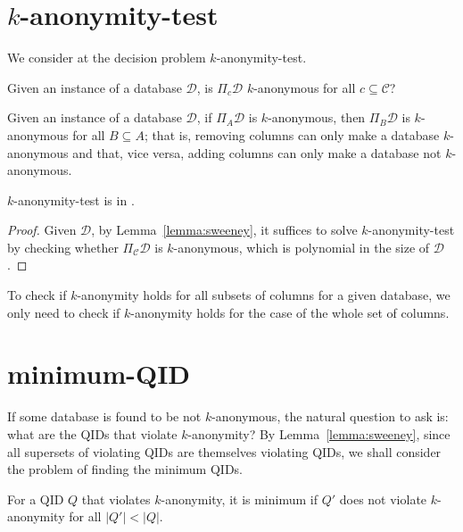 \documentclass[12pt]{llncs}
\newcommand{\cC}{\mathcal{C}}
\newcommand{\cD}{\mathcal{D}}
\newcommand{\Proj}[1]{\Pi_{#1}}
\begin{document}
\section{$k$-anonymity-test}

We consider at the decision problem $k$-anonymity-test.

\begin{problem}
Given an instance of a database $\cD$, is $\Proj{c} \cD$ $k$-anonymous for all $c \subseteq \cC$?
\end{problem}

\begin{lemma}
Given an instance of a database $\cD$, if $\Proj{A} \cD$ is $k$-anonymous, then $\Proj{B} \cD$ is $k$-anonymous for all $B \subseteq A$; that is, removing columns can only make a database $k$-anonymous and that, vice versa, adding columns can only make a database not $k$-anonymous.
\label{lemma:sweeney}
\end{lemma}

\begin{proposition}
$k$-anonymity-test is in .
\end{proposition}

\begin{proof}
Given $\cD$, by Lemma~\ref{lemma:sweeney}, it suffices to solve $k$-anonymity-test by checking whether $\Proj{\cC} \cD$ is $k$-anonymous, which is polynomial in the size of $\cD$.
\end{proof}

\begin{corollary}
To check if $k$-anonymity holds for all subsets of columns for a given database, we only need to check if $k$-anonymity holds for the case of the whole set of columns.
\end{corollary}

\section{minimum-QID}
If some database is found to be not $k$-anonymous, the natural question to ask is: what are the QIDs that violate $k$-anonymity? By Lemma~\ref{lemma:sweeney}, since all supersets of violating QIDs are themselves violating QIDs, we shall consider the problem of finding the minimum QIDs.

\begin{definition}
For a QID $Q$ that violates $k$-anonymity, it is minimum if $Q'$ does not violate $k$-anonymity for all $|Q'| < |Q|$.
\end{definition}
\end{document}
